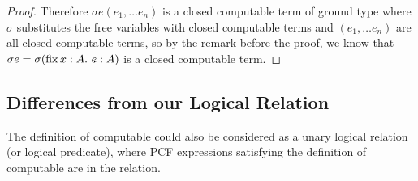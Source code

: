 \begin{proof}
Therefore $\sigma e (e_1, \dots e_n)$ is a closed computable term of ground type where $\sigma$ substitutes the free variables with closed computable terms and $(e_1, \dots e_n)$ are all closed computable terms, so by the remark before the proof, we know that $\sigma e = \sigma (\operatorname{fix} x:A. \ e : A)$ is a closed computable term.






%
\end{proof}

\subsection{Differences from our Logical Relation}
The definition of computable could also be considered as a unary logical relation (or logical predicate), where PCF expressions satisfying the definition of computable are in the relation.

